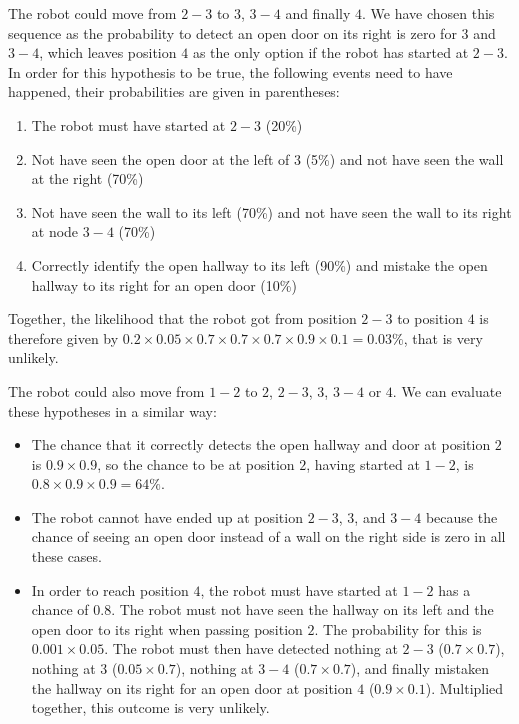 The robot could move from $2-3$ to $3$, $3-4$ and finally $4$. We have chosen this sequence as the probability to detect an open door on its right is zero for $3$ and $3-4$, which leaves position $4$ as the only option if the robot has started at $2-3$. In order for this hypothesis to be true, the following events need to have happened, their probabilities are given in parentheses:
\begin{enumerate}
    \item The robot must have started at $2-3$ (20\%)
    \item Not have seen the open door at the left of $3$ (5\%) and not have seen the wall at the right (70\%)
    \item Not have seen the wall to its left (70\%) and not have seen the wall to its right at node $3-4$ (70\%)
    \item Correctly identify the open hallway to its left (90\%) and mistake the open hallway to its right for an open door (10\%)
\end{enumerate}
Together, the likelihood that the robot got from position $2-3$ to position $4$ is therefore given by $0.2\times 0.05 \times 0.7 \times 0.7 \times 0.7 \times 0.9 \times0.1=0.03\%$, that is very unlikely.

The robot could also move from $1-2$ to $2$, $2-3$, $3$, $3-4$ or $4$. We can evaluate these hypotheses in a similar way:
\begin{itemize}
    \item The chance that it correctly detects the open hallway and door at position $2$ is $0.9 \times 0.9$, so the chance to be at position $2$, having started at $1-2$, is $0.8 \times 0.9 \times 0.9=64\%$.
    \item The robot cannot have ended up at position $2-3$, $3$, and $3-4$ because the chance of seeing an open door instead of a wall on the right side is zero in all these cases.
    \item In order to reach position $4$, the robot must have started at $1-2$ has a chance of $0.8$. The robot must not have seen the hallway on its left and the open door to its right when passing position $2$. The probability for this is $0.001 \times 0.05$. The robot must then have detected nothing at $2-3$ ($0.7 \times 0.7$), nothing at $3$ ($0.05 \times 0.7$), nothing at $3-4$ ($0.7 \times 0.7$), and finally mistaken the hallway on its right for an open door at position $4$ ($0.9 \times 0.1$). Multiplied together, this outcome is very unlikely.
\end{itemize}

